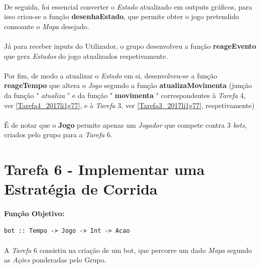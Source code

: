 \documentclass[12pt,a4paper]{report}
\begin{document}
\paragraph{} De seguida, foi essencial converter o \textit{Estado} atualizado em outputs gráficos, para isso criou-se a função \textbf{desenhaEstado}, que permite obter o jogo pretendido consoante o \textit{Mapa} desejado.
\paragraph{} Já para receber inputs do Utilizador, o grupo desenvolveu a função \textbf{reageEvento} que gera \textit{Estados} do jogo atualizados respetivamente.
\paragraph{} Por fim, de modo a atualizar o \textit{Estado} em si, desenvolveu-se a função \textbf{reageTempo} que altera o \textit{Jogo} segundo a função \textbf{atualizaMovimenta} (junção da função " \textit{atualiza} " e da função " \textbf{movimenta} " correspondentes à \textit{Tarefa} 4, ver \ref{Tarefa4_2017li1g77}, e à \textit{Tarefa} 3, ver \ref{Tarefa3_2017li1g77}, respetivamente)
\paragraph{} É de notar que o \textbf{Jogo} permite apenas um \textit{Jogador} que compete contra 3 \textit{bots}, criados pelo grupo para a \textit{Tarefa} 6.

\newpage
\section{Tarefa 6 - Implementar uma Estratégia de Corrida }
\label{Tarefa6_2017li1g77}

\paragraph{}\textbf{Função Objetivo:}

\begin{verbatim}
bot :: Tempo -> Jogo -> Int -> Acao
\end{verbatim}

\paragraph{} A \textit{Tarefa} 6 consistiu na criação de um bot, que percorre um dado \textit{Mapa} segundo as \textit{Ações} ponderadas pelo Grupo.
\end{document}

